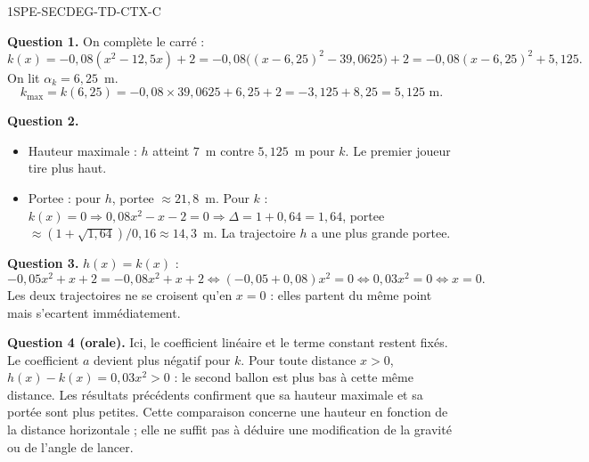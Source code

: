 \begin{corrige}{1SPE-SECDEG-TD-CTX-C}

\textbf{Question 1.} On complète le carré :
\[
k(x)=-0{,}08(x^2-12{,}5x)+2
=-0{,}08\bigl((x-6{,}25)^2-39{,}0625\bigr)+2
=-0{,}08(x-6{,}25)^2+5{,}125.
\]
On lit $\alpha_k=6{,}25$~m.
\[
k_{\max} = k(6{,}25) = -0{,}08 \times 39{,}0625 + 6{,}25 + 2 = -3{,}125 + 8{,}25 = 5{,}125 \text{ m}.
\]

\textbf{Question 2.}
\begin{itemize}
  \item Hauteur maximale : $h$ atteint $7$~m contre $5{,}125$~m pour $k$. Le premier joueur tire plus haut.
  \item Portee : pour $h$, portee $\approx 21{,}8$~m. Pour $k$ : $k(x) = 0 \Rightarrow 0{,}08x^2 - x - 2 = 0 \Rightarrow \Delta = 1 + 0{,}64 = 1{,}64$, portee $\approx (1 + \sqrt{1{,}64})/0{,}16 \approx 14{,}3$~m. La trajectoire $h$ a une plus grande portee.
\end{itemize}

\textbf{Question 3.} $h(x) = k(x)$ :
\[
-0{,}05x^2 + x + 2 = -0{,}08x^2 + x + 2
\Leftrightarrow (-0{,}05 + 0{,}08)x^2 = 0
\Leftrightarrow 0{,}03x^2 = 0
\Leftrightarrow x = 0.
\]
Les deux trajectoires ne se croisent qu'en $x = 0$ : elles partent du même point mais s'ecartent immédiatement.


\textbf{Question 4 (orale).} Ici, le coefficient linéaire et le terme constant
restent fixés. Le coefficient $a$ devient plus négatif pour $k$.
Pour toute distance $x>0$, $h(x)-k(x)=0{,}03x^2>0$ : le second ballon est plus bas
à cette même distance. Les résultats précédents confirment que sa hauteur
maximale et sa portée sont plus petites. Cette comparaison concerne une
hauteur en fonction de la distance horizontale ; elle ne suffit pas à déduire
une modification de la gravité ou de l'angle de lancer.

\end{corrige}
